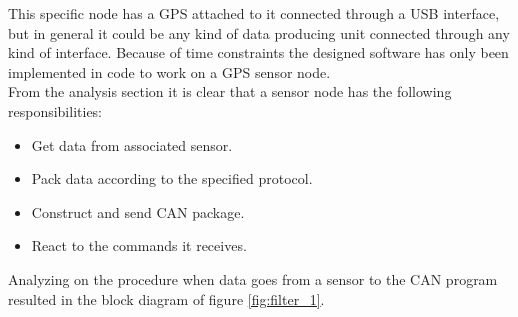 This specific node has a GPS attached to it connected through a USB interface, but in general it could be any kind of data producing unit connected through any kind of interface.
Because of time constraints the designed software has only been implemented in code to work on a GPS sensor node.
\\From the analysis section it is clear that a sensor node has the following responsibilities:

\begin{itemize}
\item Get data from associated sensor.
\item Pack data according to the specified protocol.
\item Construct and send CAN package.
\item React to the commands it receives.
\end{itemize}

Analyzing on the procedure when data goes from a sensor to the CAN program resulted in the block diagram of figure \ref{fig:filter_1}.

